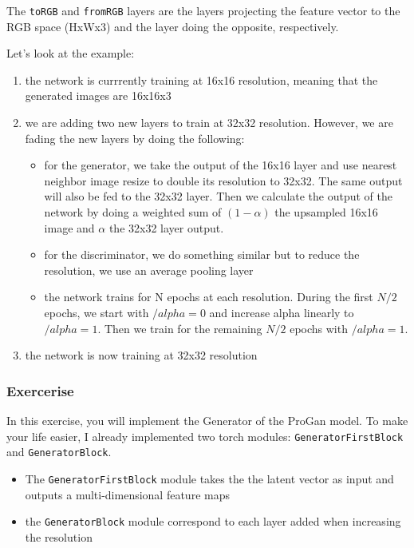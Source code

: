 The \lstinline{toRGB} and
\lstinline{fromRGB} layers are the layers projecting the
feature vector to the RGB space (HxWx3) and the layer doing the
opposite, respectively. \newline

Let's look at the example: 
\begin{enumerate}[label=\textbf{(\alph*)}]
    \item the network is currrently training at 16x16 resolution, meaning that the generated images are 16x16x3
    \item we are adding two new layers to train at 32x32 resolution. However, we are fading the new layers by doing the following:
    \begin{itemize}
        \item for the generator, we take the output of the 16x16 layer and use nearest neighbor image resize to double its resolution to 32x32. The same output will also be fed to the 32x32 layer. Then we calculate the output of the network by doing a weighted sum of \((1- \alpha)\) the upsampled 16x16 image and \(\alpha\) the 32x32 layer output.
        \item for the discriminator, we do something similar but to reduce the resolution, we use an average pooling layer
        \item the network trains for N epochs at each resolution. During the first \(N/2\) epochs, we start with \(/alpha = 0\) and increase alpha linearly to \(/alpha = 1\). Then we train for the remaining \(N/2\) epochs with \(/alpha = 1\).
    \end{itemize}
    \item the network is now training at 32x32 resolution
\end{enumerate}

\subsubsection{Exercerise}
In this exercise, you will implement the Generator of the ProGan model. To make your life easier, I already implemented two torch modules: \lstinline{GeneratorFirstBlock} and \lstinline{GeneratorBlock}. 
\begin{itemize}
    \item The \lstinline{GeneratorFirstBlock} module takes the the latent vector as input and outputs a multi-dimensional feature maps
    \item the \lstinline{GeneratorBlock} module correspond to each layer added when increasing the resolution
\end{itemize}

